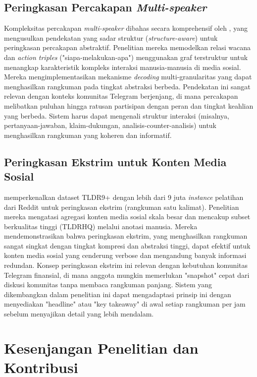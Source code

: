 \subsection{Peringkasan Percakapan \textit{Multi-speaker}}

Kompleksitas percakapan \textit{multi-speaker} dibahas secara komprehensif oleh \textcite{chen2021}, yang mengusulkan pendekatan yang sadar struktur (\textit{structure-aware}) untuk peringkasan percakapan abstraktif. Penelitian mereka memodelkan relasi wacana dan \textit{action triples} ("siapa-melakukan-apa") menggunakan graf terstruktur untuk menangkap karakteristik kompleks interaksi manusia-manusia di media sosial. Mereka mengimplementasikan mekanisme \textit{decoding} multi-granularitas yang dapat menghasilkan rangkuman pada tingkat abstraksi berbeda. Pendekatan ini sangat relevan dengan konteks komunitas Telegram berjenjang, di mana percakapan melibatkan puluhan hingga ratusan partisipan dengan peran dan tingkat keahlian yang berbeda. Sistem harus dapat mengenali struktur interaksi (misalnya, pertanyaan-jawaban, klaim-dukungan, analisis-counter-analisis) untuk menghasilkan rangkuman yang koheren dan informatif.

\subsection{Peringkasan Ekstrim untuk Konten Media Sosial}

\textcite{sotudeh2021} memperkenalkan dataset TLDR9+ dengan lebih dari 9 juta \textit{instance} pelatihan dari Reddit untuk peringkasan ekstrim (rangkuman satu kalimat). Penelitian mereka mengatasi agregasi konten media sosial skala besar dan mencakup subset berkualitas tinggi (TLDRHQ) melalui anotasi manusia. Mereka mendemonstrasikan bahwa peringkasan ekstrim, yang menghasilkan rangkuman sangat singkat dengan tingkat kompresi dan abstraksi tinggi, dapat efektif untuk konten media sosial yang cenderung verbose dan mengandung banyak informasi redundan. Konsep peringkasan ekstrim ini relevan dengan kebutuhan komunitas Telegram finansial, di mana anggota mungkin memerlukan "snapshot" cepat dari diskusi komunitas tanpa membaca rangkuman panjang. Sistem yang dikembangkan dalam penelitian ini dapat mengadaptasi prinsip ini dengan menyediakan "headline" atau "key takeaway" di awal setiap rangkuman per jam sebelum menyajikan detail yang lebih mendalam.

\section{Kesenjangan Penelitian dan Kontribusi}
\label{sec:research-gaps}

